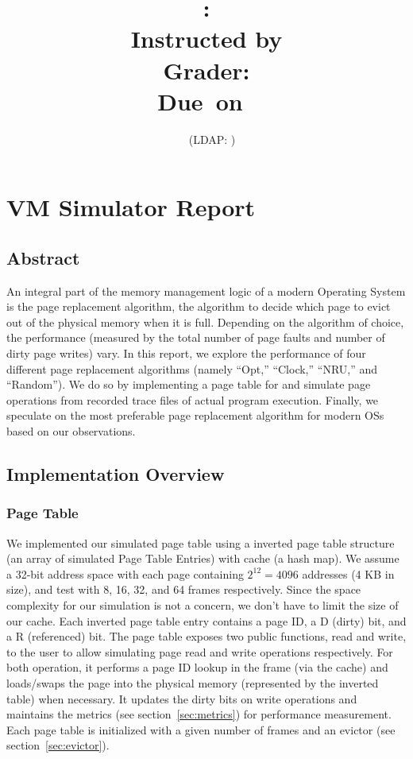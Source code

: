 \documentclass[letterpaper]{article}
\title{\textmd{\bf \Class: \Title}\\{\large Instructed by \textit{\ClassInstructor}}\\{\vspace{-0.1in}\small Grader: \textit{\ClassGrader}}\\\normalsize\vspace{0.1in}\small{Due\ on\ \DueDate}}
\author{\textbf{\StudentName}\ \ (LDAP: \StudentLDAP)}
\begin{document}
\maketitle \thispagestyle{fpfancy}


\section{VM Simulator Report}
\subsection{Abstract}
An integral part of the memory management logic of a modern Operating System is the page replacement algorithm, the algorithm to decide which page to evict out of the physical memory when it is full. Depending on the algorithm of choice, the performance (measured by the total number of page faults and number of dirty page writes) vary. In this report, we explore the performance of four different page replacement algorithms (namely ``Opt,'' ``Clock,'' ``NRU,'' and ``Random''). We do so by implementing a page table for and simulate page operations from recorded trace files of actual program execution. Finally, we speculate on the most preferable page replacement algorithm for modern OSs based on our observations.
\subsection{Implementation Overview}
\subsubsection{Page Table}
We implemented our simulated page table using a inverted page table structure (an array of simulated Page Table Entries) with cache (a hash map). We assume a 32-bit address space with each page containing $2^12=4096$ addresses (4 KB in size), and test with 8, 16, 32, and 64 frames respectively. Since the space complexity for our simulation is not a concern, we don't have to limit the size of our cache. Each inverted page table entry contains a page ID, a D (dirty) bit, and a R (referenced) bit. The page table exposes two public functions, read and write, to the user to allow simulating page read and write operations respectively. For both operation, it performs a page ID lookup in the frame (via the cache) and loads/swaps the page into the physical memory (represented by the inverted table) when necessary. It updates the dirty bits on write operations and maintains the metrics (see section~\ref{sec:metrics}) for performance measurement. Each page table is initialized with a given number of frames and an evictor (see section~\ref{sec:evictor}).
\end{document}
